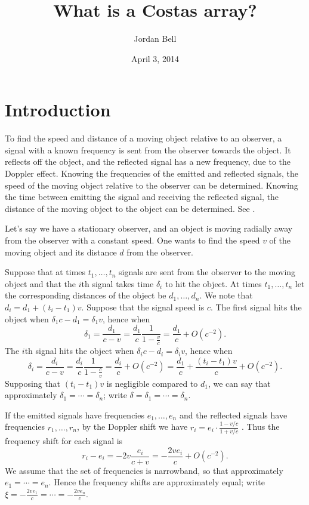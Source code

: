 \documentclass[10pt]{article}
\begin{document}
\title{What is a Costas array?}
\author{Jordan Bell}
\date{April 3, 2014}

\maketitle

\section{Introduction}

To find the speed and distance
of a moving object relative to an observer,
a signal with a known frequency is sent from the observer towards the object.
It reflects off the object, and the reflected signal has a new frequency,
due to the Doppler effect. Knowing the frequencies of the emitted and
reflected signals, the speed
of the moving object relative to the observer can be determined.
Knowing the time between emitting the signal and receiving the
reflected signal, the distance of the moving object to the object
can be determined. See \cite[p. 74]{levanon}.

Let's say we have a stationary observer, and an object is moving radially
away from the observer with a constant speed. One wants to find the
speed $v$ of the moving object and its distance $d$
from the observer.   

Suppose that at times $t_1,\ldots,t_n$ signals are sent from the observer
to the moving object and that the $i$th signal takes time $\delta_i$
to hit the object.
At times $t_1,\ldots,t_n$ let the corresponding distances of the
object be $d_1,\ldots,d_n$. We note that
$d_i=d_1+(t_i-t_1)v$.
Suppose that the signal speed is $c$.
The first signal hits the object when $\delta_1 c-d_1=\delta_1 v$, hence when
\[
\delta_1=\frac{d_1}{c-v}=\frac{d_1}{c}\frac{1}{1-\frac{v}{c}}=\frac{d_1}{c}
+O(c^{-2}).
\]
The $i$th signal hits the object when $\delta_ic-d_i=\delta_iv$, hence when
\[
\delta_i=\frac{d_i}{c-v}=\frac{d_i}{c}\frac{1}{1-\frac{c}{v}}
=\frac{d_i}{c}+O(c^{-2})
=\frac{d_1}{c}+\frac{(t_i-t_1)v}{c}+O(c^{-2}).
\]
Supposing that $(t_i-t_1)v$ is negligible compared to $d_1$,
we can say that approximately $\delta_1=\cdots=\delta_n$;
write $\delta=\delta_1=\cdots=\delta_n$.

If the emitted signals have frequencies $e_1,\ldots,e_n$ and
the reflected signals have frequencies $r_1,\ldots,r_n$, 
by the Doppler shift we have $r_i=e_i\cdot \frac{1-v/c}{1+v/c}$
\cite[p. 4]{levanon}. Thus
the frequency shift for each signal is
\[
r_i-e_i=-2v\frac{e_i}{c+v}=-\frac{2ve_i}{c}+O(c^{-2}).
\]
We assume that the set of frequencies is narrowband, so that approximately
$e_1=\cdots=e_n$. Hence the frequency shifts are approximately equal;
write
$\xi=-\frac{2ve_1}{c}=\cdots=-\frac{2ve_n}{c}$.
\end{document}
